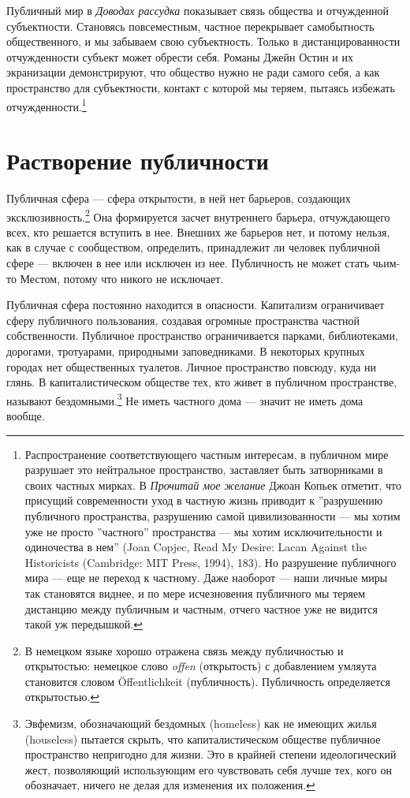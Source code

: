 \documentclass[12pt]{book}
\begin{document}
Публичный мир в \textit{Доводах рассудка} показывает связь общества и отчужденной субъектности. Становясь повсеместным, частное перекрывает самобытность общественного, и мы забываем свою субъектность. Только в дистанцированности отчужденности субъект может обрести себя. Романы Джейн Остин и их экранизации демонстрируют, что общество нужно не ради самого себя, а как пространство для субъектности, контакт с которой мы теряем, пытаясь избежать отчужденности.\footnote{Распространение соответствующего частным интересам, в публичном мире разрушает это нейтральное пространство, заставляет быть затворниками в своих частных мирках. В \textit{Прочитай мое желание} Джоан Копьек отметит, что присущий современности уход в частную жизнь приводит к ''разрушению публичного пространства, разрушению самой цивилизованности --- мы хотим уже не просто ''частного'' пространства --- мы хотим исключительности и одиночества в нем'' (Joan Copjec, Read My Desire: Lacan Against the Historicists (Cambridge: MIT Press, 1994), 183). Но разрушение публичного мира --- еще не переход к частному. Даже наоборот --- наши личные миры так становятся виднее, и по мере исчезновения публичного мы теряем дистанцию между публичным и частным, отчего частное уже не видится такой уж передышкой.}

\section{Растворение публичности}

Публичная сфера --- сфера открытости, в ней нет барьеров, создающих эксклюзивность.\footnote{В немецком языке хорошо отражена связь между публичностью и открытостью: немецкое слово \textit{offen} (открытость) с добавлением умляута становится словом Öffentlichkeit (публичность). Публичность определяется открытостью.} Она формируется засчет внутреннего барьера, отчуждающего всех, кто решается вступить в нее. Внешних же барьеров нет, и потому нельзя, как в случае с сообществом, определить, принадлежит ли человек публичной сфере --- включен в нее или исключен из нее. Публичность не может стать чьим-то Местом, потому что никого не исключает.

Публичная сфера постоянно находится в опасности. Капитализм ограничивает сферу публичного пользования, создавая огромные пространства частной собственности. Публичное пространство ограничивается парками, библиотеками, дорогами, тротуарами, природными заповедниками. В некоторых крупных городах нет общественных туалетов. Личное пространство повсюду, куда ни глянь. В капиталистическом обществе тех, кто живет в публичном пространстве, называют бездомными.\footnote{Эвфемизм, обозначающий бездомных (homeless) как не имеющих жилья (houseless) пытается скрыть, что капиталистическом обществе публичное пространство непригодно для жизни. Это в крайней степени идеологический жест, позволяющий использующим его чувствовать себя лучше тех, кого он обозначает, ничего не делая для изменения их положения.} Не иметь частного дома --- значит не иметь дома вообще.
\end{document}
